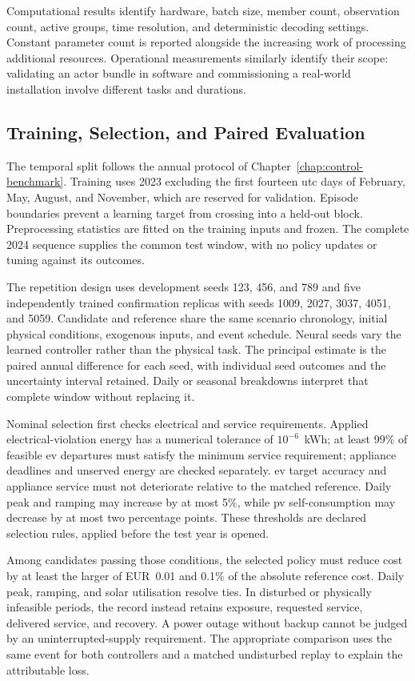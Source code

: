 Computational results identify hardware, batch size, member count, observation count, active groups, time resolution, and deterministic decoding settings. Constant parameter count is reported alongside the increasing work of processing additional resources. Operational measurements similarly identify their scope: validating an actor bundle in software and commissioning a real-world installation involve different tasks and durations.

\subsection{Training, Selection, and Paired Evaluation}
\label{sec:timarl-protocol}

The temporal split follows the annual protocol of Chapter~\ref{chap:control-benchmark}. Training uses 2023 excluding the first fourteen \gls{utc} days of February, May, August, and November, which are reserved for validation. Episode boundaries prevent a learning target from crossing into a held-out block. Preprocessing statistics are fitted on the training inputs and frozen. The complete 2024 sequence supplies the common test window, with no policy updates or tuning against its outcomes.

The repetition design uses development seeds 123, 456, and 789 and five independently trained confirmation replicas with seeds 1009, 2027, 3037, 4051, and 5059. Candidate and reference share the same scenario chronology, initial physical conditions, exogenous inputs, and event schedule. Neural seeds vary the learned controller rather than the physical task. The principal estimate is the paired annual difference for each seed, with individual seed outcomes and the uncertainty interval retained. Daily or seasonal breakdowns interpret that complete window without replacing it.

Nominal selection first checks electrical and service requirements. Applied electrical-violation energy has a numerical tolerance of $10^{-6}$~kWh; at least 99\% of feasible \gls{ev} departures must satisfy the minimum service requirement; appliance deadlines and unserved energy are checked separately. \gls{ev} target accuracy and appliance service must not deteriorate relative to the matched reference. Daily peak and ramping may increase by at most 5\%, while \gls{pv} self-consumption may decrease by at most two percentage points. These thresholds are declared selection rules, applied before the test year is opened.

Among candidates passing those conditions, the selected policy must reduce cost by at least the larger of EUR~0.01 and 0.1\% of the absolute reference cost. Daily peak, ramping, and solar utilisation resolve ties. In disturbed or physically infeasible periods, the record instead retains exposure, requested service, delivered service, and recovery. A power outage without backup cannot be judged by an uninterrupted-supply requirement. The appropriate comparison uses the same event for both controllers and a matched undisturbed replay to explain the attributable loss.

